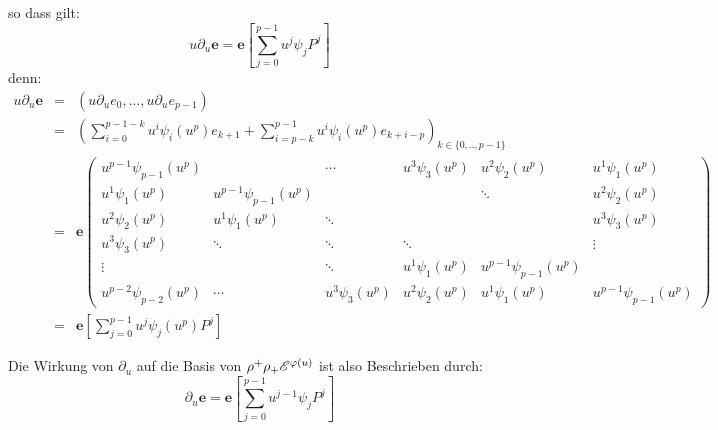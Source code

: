 so dass gilt:
\[ u\partial_u\mathbf{e}=\mathbf{e}[\sum_{j=0}^{p-1}u^j\psi_jP^j] \]
denn:\\
\begin{eqnarray*}
  u\partial_u\mathbf{e} & = & (u\partial_ue_0,...,u\partial_ue_{p-1})\\
  & = & (\sum_{i=0}^{p-1-k}u^i\psi_i(u^p)e_{k+1} +
    \sum_{i=p-k}^{p-1}u^i\psi_i(u^p)e_{k+i-p})_{k\in\{0,..,p-1\}}\\
  & = & \mathbf{e}
  \begin{pmatrix}u^{p-1}\psi_{p-1}(u^p) &  & \cdots & u^{3}\psi_{3}(u^p) & u^{2}
    \psi_{2}(u^p) & u^{1}\psi_{1}(u^p)\\
    u^{1}\psi_{1}(u^p) & u^{p-1}\psi_{p-1}(u^p) &  &  
    & \ddots & u^{2}\psi_{2}(u^p)\\
    u^{2}\psi_{2}(u^p) & u^{1}\psi_{1}(u^p) & \ddots &  &  & u^{3}\psi_{3}(u^p)\\
    u^{3}\psi_{3}(u^p) & \ddots & \ddots & \ddots &  & \vdots\\
    \vdots &  & \ddots & u^{1}\psi_{1}(u^p) & u^{p-1}\psi_{p-1}(u^p)\\
    u^{p-2}\psi_{p-2}(u^p) & \cdots & u^{3}\psi_{3}(u^p) & u^{2}\psi_{2}(u^p) &
    u^{1}\psi_{1}(u^p) & u^{p-1}\psi_{p-1}(u^p)
  \end{pmatrix}\\
  & = & \mathbf{e}[\sum_{j=0}^{p-1}u^j\psi_j(u^p)P^j]
\end{eqnarray*}


Die Wirkung von $\partial_u$ auf die Basis von $\rho^+\rho_+{\mathscr E}^{\varphi(u)}$ ist
also Beschrieben durch:
\[ \partial_u\mathbf{e}=\mathbf{e}[\sum_{j=0}^{p-1}u^{j-1}\psi_jP^j] \]

